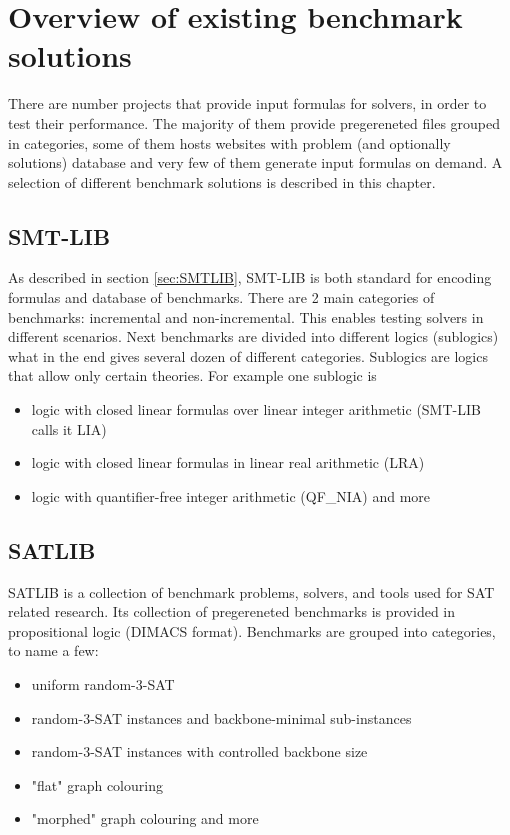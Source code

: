 \chapter{Overview of existing benchmark solutions}
\label{chap:ExistingBenchmarkSolutions}

There are number projects that provide input formulas for solvers, in order to test their performance. The majority of them provide pregereneted files grouped in categories, some of them hosts websites with problem (and optionally solutions) database and very few of them generate input formulas on demand. A selection of different benchmark solutions is described in this chapter.

\section{SMT-LIB}
\label{sec:SMTLIBBenchmarks}

As described in section \ref{sec:SMTLIB}, SMT-LIB is both standard for encoding formulas and database of benchmarks. There are 2 main categories of benchmarks: incremental and non-incremental. This enables testing solvers in different scenarios. Next benchmarks are divided into different logics (sublogics) what in the end gives several dozen of different categories. Sublogics are logics that allow only certain theories. For example one sublogic is 
\begin{itemize}
  \item logic with closed linear formulas over linear integer arithmetic (SMT-LIB calls it LIA)
  \item logic with closed linear formulas in linear real arithmetic (LRA) 
  \item logic with quantifier-free integer arithmetic (QF\_NIA) and more
\end{itemize}

\section{SATLIB}

SATLIB \cite{Hol00} is a collection of benchmark problems, solvers, and tools used for SAT related research. Its collection of pregereneted benchmarks is provided in propositional logic (DIMACS format). Benchmarks are grouped into categories, to name a few:
\begin{itemize}
\item uniform random-3-SAT
\item random-3-SAT instances and backbone-minimal sub-instances
\item random-3-SAT instances with controlled backbone size
\item "flat" graph colouring
\item "morphed" graph colouring and more
\end{itemize}

